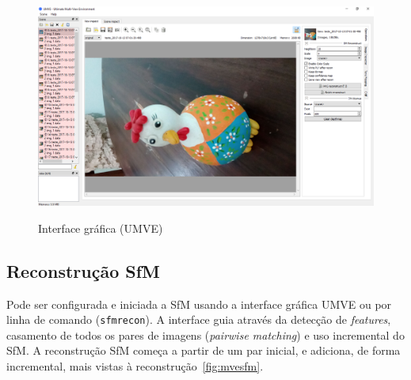 \begin{figure}[!h]
	\centering
	\caption{%
	Interface gráfica (UMVE)%
	}
	\includegraphics[width=\linewidth]{figs/umve1.png}
	\label{fig:umve:gui}
\end{figure}
\subsection{Reconstrução SfM}

Pode ser configurada e iniciada a SfM usando a interface gráfica UMVE ou por linha de
comando (\texttt{sfmrecon}). A interface guia através da detecção de
\emph{features}, casamento de todos os pares de imagens (\emph{pairwise matching}) e uso
incremental do SfM. A reconstrução SfM começa a partir de um
par inicial, e adiciona, de forma incremental, mais vistas à
reconstrução~\ref{fig:mvesfm}.

\newpage

